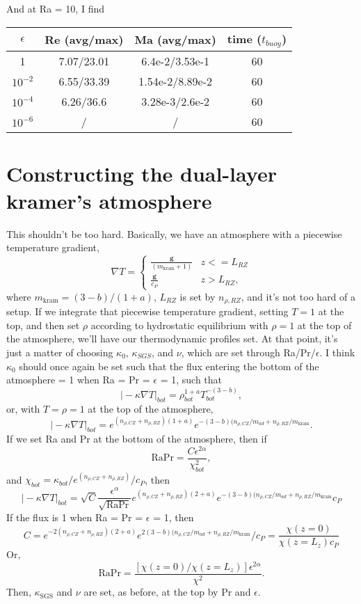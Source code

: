 \documentclass[aps, pre, onecolumn, nofootinbib, notitlepage, groupedaddress, amsfonts, amssymb, amsmath, longbibliography]{revtex4-1}
\newcommand{\grad}{\ensuremath{\nabla}}
\begin{document}
And at Ra = 10, I find


\begin{center}
 \begin{tabular}{||c c c c||} 
 \hline
 $\epsilon$ & Re (avg/max) & Ma (avg/max) & time ($t_{buoy}$) \\ [0.5ex] 
 \hline\hline
 1 & 7.07/23.01 & 6.4e-2/3.53e-1 & 60 \\ 
 \hline
 $10^{-2}$ & 6.55/33.39 & 1.54e-2/8.89e-2 & 60 \\
 \hline
 $10^{-4}$ & 6.26/36.6 & 3.28e-3/2.6e-2 & 60 \\
 \hline
 $10^{-6}$ & / & / & 60 \\
 \hline
\end{tabular}
\end{center}



\section{Constructing the dual-layer kramer's atmosphere}
This shouldn't be too hard. Basically, we have an atmosphere with a piecewise
temperature gradient,
$$
\grad T = \begin{cases}
\frac{\bm{g}}{(m_{\text{kram}} + 1)} & z <= L_{RZ} \\
\frac{\bm{g}}{c_P}                   & z > L_{RZ},
\end{cases}
$$
where $m_{\text{kram}} = (3-b)/(1+a)$, $L_{RZ}$ is set by $n_{\rho, RZ}$, and
it's not too hard of a setup. If we integrate that piecewise temperature gradient,
setting $T = 1$ at the top, and then set $\rho$ according to hydrostatic 
equilibrium with $\rho = 1$ at the top of the atmosphere, we'll have our 
thermodynamic profiles set. At that point, it's just a matter of choosing 
$\kappa_0$, $\kappa_{SGS}$, and $\nu$, which are set through Ra/Pr/$\epsilon$.
I think $\kappa_0$ should once again be set such that the flux entering the
bottom of the atmosphere = 1 when Ra = Pr = $\epsilon$ = 1, such that
$$
\bigg|-\kappa\grad T\bigg|_{bot} = \rho_{bot}^{1+a}T_{bot}^{-(3-b)},
$$
or, with $T = \rho = 1$ at the top of the atmosphere,
$$
\bigg| -\kappa\grad T\bigg|_{bot} 
=  e^{(n_{\rho, CZ} + n_{\rho, RZ})(1+a)} 
e^{-(3-b)(n_{\rho, CZ}/m_{ad} + n_{\rho, RZ}/m_{\text{kram}}}.
$$
If we set Ra and Pr at the bottom of the atmosphere, then if 
$$
\text{RaPr} = \frac{C\epsilon^{2\alpha}}{\chi_{bot}^2},
$$ 
and $\chi_{bot} = \kappa_{bot} / e^{(n_{\rho, CZ} + n_{\rho, RZ})} / c_P$,
then
$$
\bigg| -\kappa\grad T\bigg|_{bot}
= \sqrt{C} \frac{\epsilon^{\alpha}}{\sqrt{\text{RaPr}}}
e^{(n_{\rho, CZ} + n_{\rho, RZ})(2+a)} 
e^{-(3-b)(n_{\rho, CZ}/m_{ad} + n_{\rho, RZ}/m_{\text{kram}}} c_P
$$
If the flux is 1 when Ra = Pr = $\epsilon$ = 1, then
$$
C = e^{-2(n_{\rho, CZ} + n_{\rho, RZ})(2+a)}
e^{2(3-b)(n_{\rho, CZ}/m_{ad} + n_{\rho, RZ}/m_{\text{kram}}} / c_P
= \frac{\chi(z=0)}{\chi(z=L_z)c_P}
$$
Or,
$$
\text{RaPr} = \frac{[\chi(z=0)/\chi(z=L_z)] \epsilon^{2\alpha}}{\chi^2}.
$$
Then, $\kappa_{\text{SGS}}$ and $\nu$ are set, as before, at the top by
Pr and $\epsilon$.
\end{document}
